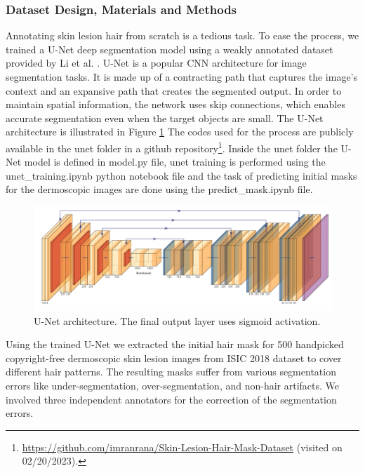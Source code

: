 \subsubsection{Dataset Design, Materials and Methods}
Annotating skin lesion hair from scratch is a tedious task. To ease the process, we trained a U-Net \cite{10.1007/978-3-319-24574-4_28} deep segmentation model using a weakly annotated dataset provided by Li et al. \cite{Li2021a}. U-Net is a popular CNN architecture for image segmentation tasks. It is made up of a contracting path that captures the image's context and an expansive path that creates the segmented output. In order to maintain spatial information, the network uses skip connections, which enables accurate segmentation even when the target objects are small. The U-Net architecture is illustrated in Figure \ref{fig:unet} The codes used for the process are publicly available in the unet folder in a github repository\footnote{\url{https://github.com/imranrana/Skin-Lesion-Hair-Mask-Dataset} (visited on 02/20/2023).\label{note:github_mask}}. Inside the unet folder the U-Net model is defined in model.py file, unet training is performed using the unet\_training.ipynb python notebook file and the task of predicting initial masks for the dermoscopic images are done using the predict\_mask.ipynb file.
\begin{figure}[htb!]
	\centering
	\includegraphics[width=\textwidth,keepaspectratio]{images/ongoing/u-net.pdf}
	\caption[U-Net architecture]{U-Net architecture. The final output layer uses sigmoid activation.}
	\label{fig:unet}
\end{figure}

Using the trained U-Net we extracted the initial hair mask for 500 handpicked copyright-free dermoscopic skin lesion images from ISIC 2018 dataset \cite{Codella2019} to cover different hair patterns. The resulting masks suffer from various segmentation errors like under-segmentation, over-segmentation, and non-hair artifacts. We involved three independent annotators for the correction of the segmentation errors. 

